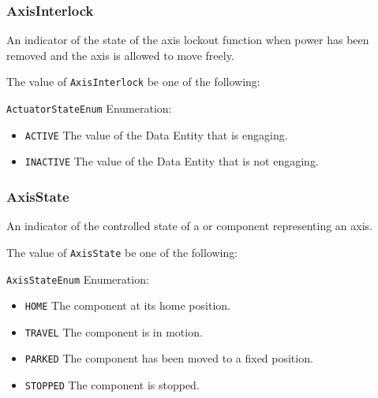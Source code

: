 \subsubsection{AxisInterlock}
\label{sec:AxisInterlock}



An indicator of the state of the axis lockout function when power has been removed and the axis is allowed to move freely.


The value of \texttt{AxisInterlock} \MUST be one of the following: 


\texttt{ActuatorStateEnum} Enumeration:

\begin{itemize}
\item \texttt{ACTIVE} \newline The value of the \gls{Data Entity} that is engaging. 
\item \texttt{INACTIVE} \newline The value of the \gls{Data Entity} that is not engaging. 
\end{itemize}

\FloatBarrier

\subsubsection{AxisState}
\label{sec:AxisState}



An indicator of the controlled state of a  or  component representing an axis.


The value of \texttt{AxisState} \MUST be one of the following: 


\texttt{AxisStateEnum} Enumeration:

\begin{itemize}
\item \texttt{HOME} \newline The component at its home position. 
\item \texttt{TRAVEL} \newline The component is in motion. 
\item \texttt{PARKED} \newline The component has been moved to a fixed position. 
\item \texttt{STOPPED} \newline The component is stopped. 
\end{itemize}

\FloatBarrier

